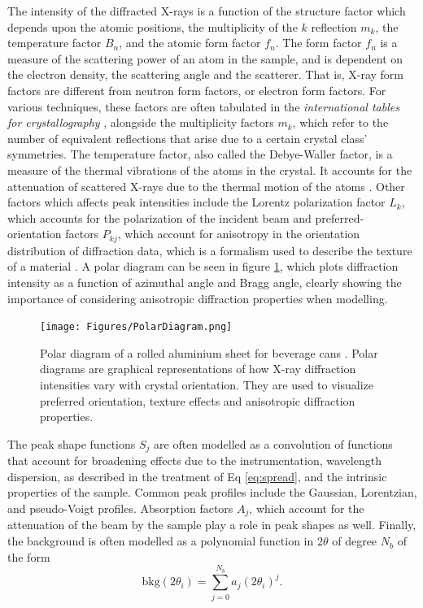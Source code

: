 \documentclass[aps,prb,twocolumn,superscriptaddress]{revtex4-2}
\begin{document}
The intensity of the diffracted X-rays is a function of the structure factor
which depends upon the atomic positions, the multiplicity of the $k$ 
reflection $m_k$, the temperature factor $B_n$, and the atomic form factor $f_n$.
The form factor $f_n$ is a measure of the scattering power of an atom in the sample,
and is dependent on the electron density, the scattering angle and the
scatterer. That is, X-ray form factors are different from neutron form factors,
or electron form factors.  For various techniques, these factors are often
tabulated in the \textit{international tables for crystallography}
\cite{ITC_VolC}, alongside the multiplicity factors $m_k$, which refer to the
number of equivalent reflections that arise due to a certain crystal class'
symmetries.  The temperature factor, also called the Debye-Waller factor, is a
measure of the thermal vibrations of the atoms in the crystal. It accounts for
the attenuation of scattered X-rays due to the thermal motion of the atoms
\cite{Girolami}. Other factors which affects peak intensities include the Lorentz 
polarization factor $L_k$, which accounts for the polarization of the incident
beam and preferred-orientation factors $P_{kj}$, which account for anisotropy in 
the orientation distribution of diffraction data, which is a formalism used to 
describe the texture of a material \cite{BINNS2022231}. A polar diagram can be 
seen in figure \ref{fig:PolarDiagram}, which plots diffraction intensity 
as a function of azimuthal angle and Bragg angle, clearly showing the 
importance of considering anisotropic diffraction properties when modelling.

\begin{figure}[h]
    \centering
    \texttt{[image: Figures/PolarDiagram.png]}
    \caption{Polar diagram of a rolled aluminium sheet for beverage cans
        \cite{WRIGHT2005221}. Polar diagrams are graphical representations
        of how X-ray diffraction intensities vary with crystal orientation.
        They are used to visualize preferred orientation, texture effects 
        and anisotropic diffraction properties.
    }
    \label{fig:PolarDiagram}
\end{figure}


The peak shape functions $S_j$ are often modelled as a convolution of functions
that account for broadening effects due to the instrumentation, wavelength
dispersion, as described in the treatment of Eq \ref{eq:spread}, and the
intrinsic properties of the sample. Common peak profiles include the Gaussian,
Lorentzian, and pseudo-Voigt profiles. Absorption factors $A_j$, which account
for the attenuation of the beam by the sample play a role in peak shapes as well. 
    Finally, the background is often modelled as a polynomial function in $2\theta$ 
of degree $N_b$ of the form
\begin{equation}
    \text{bkg}(2\theta_i) = \sum_{j=0}^{N_b} a_j(2\theta_i)^j.
\end{equation}
\end{document}
